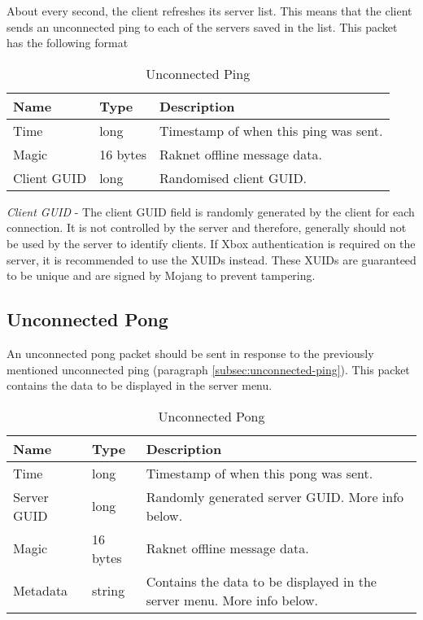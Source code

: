 \documentclass[12pt]{report}
\begin{document}
About every second, the client refreshes its server list.
This means that the client sends an unconnected ping to each of the servers saved in the list.
This packet has the following format

\begin{table}[H]
    \begin{center}
    \label{tab:unconnected-ping}
    \caption{Unconnected Ping}
    \vspace{0.5cm}
    \begin{tabularx}{\textwidth}{|l|l|X|}
        \hline
        \rowcolor{yellow}
        Name & Type & Description \\
        \hline
        Time & long & Timestamp of when this ping was sent. \\
        \hline
        Magic & 16 bytes & Raknet offline message data. \\
        \hline
        Client GUID & long & Randomised client GUID. \\
        \hline
    \end{tabularx}
\end{center}
\end{table}

\textit{Client GUID} - The client GUID field is randomly generated by the client for each connection.
It is not controlled by the server and therefore, generally should not be used by the server to identify clients.
If Xbox authentication is required on the server, it is recommended to use the XUIDs instead.
These XUIDs are guaranteed to be unique and are signed by Mojang to prevent tampering.

\subsection{Unconnected Pong}\label{subsec:unconnected-pong}

An unconnected pong packet should be sent in response to the previously mentioned unconnected ping (paragraph \ref{subsec:unconnected-ping}).
This packet contains the data to be displayed in the server menu.

\begin{table}[H]
    \begin{center}
    \label{tab:unconnected-pong}
    \caption{Unconnected Pong}
    \vspace{0.5cm}
    \begin{tabularx}{\textwidth}{|l|l|X|}
        \hline
        \rowcolor{yellow}
        Name & Type & Description \\
        \hline
        Time & long & Timestamp of when this pong was sent. \\
        \hline
        Server GUID & long & Randomly generated server GUID. More info below. \\
        \hline
        Magic & 16 bytes & Raknet offline message data. \\
        \hline
        Metadata & string & Contains the data to be displayed in the server menu. More info below. \\
        \hline
    \end{tabularx}
\end{center}
\end{table}
\end{document}
